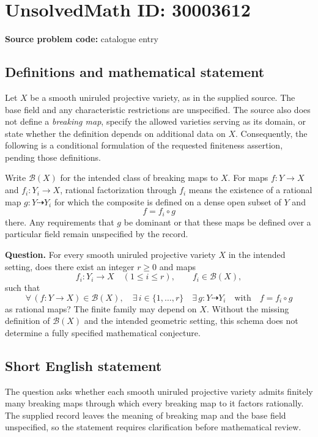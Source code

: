 \documentclass[11pt]{article}
\begin{document}
\section*{UnsolvedMath ID: 30003612}
\textbf{Source problem code:} catalogue entry
\subsection{Definitions and mathematical statement}
Let \(X\) be a smooth uniruled projective variety, as in the supplied source. The base field and any characteristic restrictions are unspecified. The source also does not define a \emph{breaking map}, specify the allowed varieties serving as its domain, or state whether the definition depends on additional data on \(X\). Consequently, the following is a conditional formulation of the requested finiteness assertion, pending those definitions.

Write \(\mathcal B(X)\) for the intended class of breaking maps to \(X\). For maps \(f:Y\to X\) and \(f_i:Y_i\to X\), rational factorization through \(f_i\) means the existence of a rational map \(g:Y\dashrightarrow Y_i\) for which the composite is defined on a dense open subset of \(Y\) and
\[
 f=f_i\circ g
\]
there. Any requirements that \(g\) be dominant or that these maps be defined over a particular field remain unspecified by the record.

\textbf{Question.} For every smooth uniruled projective variety \(X\) in the intended setting, does there exist an integer \(r\geq 0\) and maps
\[
 f_i:Y_i\to X\quad (1\leq i\leq r),\qquad f_i\in\mathcal B(X),
\]
such that
\[
 \forall\,(f:Y\to X)\in\mathcal B(X),\quad
 \exists\,i\in\{1,\ldots,r\}\quad
 \exists\,g:Y\dashrightarrow Y_i
 \quad\text{with}\quad f=f_i\circ g
\]
as rational maps? The finite family may depend on \(X\). Without the missing definition of \(\mathcal B(X)\) and the intended geometric setting, this schema does not determine a fully specified mathematical conjecture.
\subsection{Short English statement}
The question asks whether each smooth uniruled projective variety admits finitely many breaking maps through which every breaking map to it factors rationally. The supplied record leaves the meaning of breaking map and the base field unspecified, so the statement requires clarification before mathematical review.
\end{document}
